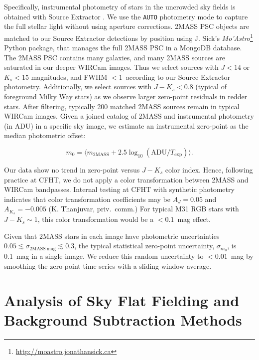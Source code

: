 \documentclass[iop,tighten]{emulateapj}
\newcommand{\sw}[1]{\textit{#1}} %
\begin{document}
Specifically, instrumental photometry of stars in the uncrowded sky fields is obtained with Source Extractor \citep{Bertin:1996}.
We use the \texttt{AUTO} photometry mode to capture the full stellar light without using aperture corrections.
2MASS PSC objects are matched to our Source Extractor detections by position using J. Sick's \sw{Mo'Astro}\footnote{\url{http://moastro.jonathansick.ca}} Python package, that manages the full 2MASS PSC in a MongoDB database.
The 2MASS PSC contains many galaxies, and many 2MASS sources are saturated in our deeper WIRCam images.
Thus we select sources with $J < 14$ or $K_s < 15$ magnitudes, and FWHM $<1$\arcsec\ according to our Source Extractor photometry.
Additionally, we select sources with $J-K_s < 0.8$ (typical of foreground Milky Way stars) as we observe larger zero-point residuals in redder stars.
After filtering, typically 200 matched 2MASS sources remain in typical WIRCam images.
Given a joined catalog of 2MASS and instrumental photometry (in ADU) in a specific sky image, we estimate an instrumental zero-point as the median photometric offset:

\begin{equation}
  \label{eq:photcal}
  m_0 = \langle m_\mathrm{2MASS} + 2.5 \log_{10}(\mathrm{ADU}/T_\mathrm{exp}) \rangle.
\end{equation}

Our data show no trend in zero-point versus $J-K_s$ color index.
Hence, following practice at CFHT, we do not apply a color transformation between 2MASS and WIRCam bandpasses.
Internal testing at CFHT with synthetic photometry indicates that color transformation coefficients may be $A_J = 0.05$ and $A_{K_s}=-0.005$ (K. Thanjuvar, priv.\ comm.)
For typical M31 RGB stars with $J-K_s\sim 1$, this color transformation would be a $< 0.1$~mag effect.

Given that 2MASS stars in each image have photometric uncertainties $0.05 \lesssim \sigma_{\mathrm{2MASS~mag}} \lesssim 0.3$, the typical statistical zero-point uncertainty, $\sigma_{m_0}$, is 0.1~mag in a single image.
We reduce this random uncertainty to $<0.01$~mag by smoothing the zero-point time series with a sliding window average.

\section{Analysis of Sky Flat Fielding and Background Subtraction Methods}
\label{sec:flatanalysis}
\end{document}
